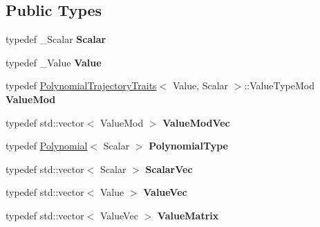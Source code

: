 \subsection*{Public Types}
\begin{DoxyCompactItemize}
\item 
typedef \+\_\+\+Scalar {\bfseries Scalar}\hypertarget{classow__core_1_1PolynomialTrajectory_a12628d3212f78b7a32962b7fbf20c069}{}\label{classow__core_1_1PolynomialTrajectory_a12628d3212f78b7a32962b7fbf20c069}

\item 
typedef \+\_\+\+Value {\bfseries Value}\hypertarget{classow__core_1_1PolynomialTrajectory_aed4a4173a09d74e83091a09760d3b1eb}{}\label{classow__core_1_1PolynomialTrajectory_aed4a4173a09d74e83091a09760d3b1eb}

\item 
typedef \hyperlink{structow__core_1_1PolynomialTrajectoryTraits}{Polynomial\+Trajectory\+Traits}$<$ Value, Scalar $>$\+::Value\+Type\+Mod {\bfseries Value\+Mod}\hypertarget{classow__core_1_1PolynomialTrajectory_aa631de38c4f4762ef2f8b22ffe939d38}{}\label{classow__core_1_1PolynomialTrajectory_aa631de38c4f4762ef2f8b22ffe939d38}

\item 
typedef std\+::vector$<$ Value\+Mod $>$ {\bfseries Value\+Mod\+Vec}\hypertarget{classow__core_1_1PolynomialTrajectory_a614721e904d7b1cd4f2034cb5960f1f6}{}\label{classow__core_1_1PolynomialTrajectory_a614721e904d7b1cd4f2034cb5960f1f6}

\item 
typedef \hyperlink{classow__core_1_1Polynomial}{Polynomial}$<$ Scalar $>$ {\bfseries Polynomial\+Type}\hypertarget{classow__core_1_1PolynomialTrajectory_a65688787d8b489bf02035e5289fdab72}{}\label{classow__core_1_1PolynomialTrajectory_a65688787d8b489bf02035e5289fdab72}

\item 
typedef std\+::vector$<$ Scalar $>$ {\bfseries Scalar\+Vec}\hypertarget{classow__core_1_1PolynomialTrajectory_a25c0aaf1bdef2f13bad05cf6fd0c7d85}{}\label{classow__core_1_1PolynomialTrajectory_a25c0aaf1bdef2f13bad05cf6fd0c7d85}

\item 
typedef std\+::vector$<$ Value $>$ {\bfseries Value\+Vec}\hypertarget{classow__core_1_1PolynomialTrajectory_a9697f4c44f5d270540022dbe963d6d06}{}\label{classow__core_1_1PolynomialTrajectory_a9697f4c44f5d270540022dbe963d6d06}

\item 
typedef std\+::vector$<$ Value\+Vec $>$ {\bfseries Value\+Matrix}\hypertarget{classow__core_1_1PolynomialTrajectory_a4d999427290899a9a7d6ea3b122431d0}{}\label{classow__core_1_1PolynomialTrajectory_a4d999427290899a9a7d6ea3b122431d0}


\end{DoxyCompactItemize}
